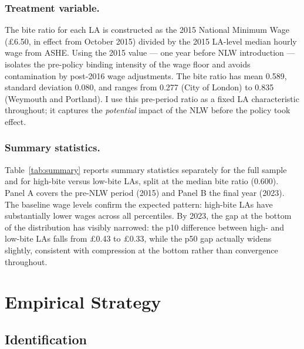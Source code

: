 \documentclass[12pt]{article}
\begin{document}
\subsubsection*{Treatment variable.}
The bite ratio for each LA is constructed as the 2015 National Minimum Wage (\pounds6.50, in effect from October 2015) divided by the 2015 LA-level median hourly wage from ASHE. Using the 2015 value --- one year before NLW introduction --- isolates the pre-policy binding intensity of the wage floor and avoids contamination by post-2016 wage adjustments. The bite ratio has mean 0.589, standard deviation 0.080, and ranges from 0.277 (City of London) to 0.835 (Weymouth and Portland). I use this pre-period ratio as a fixed LA characteristic throughout; it captures the \textit{potential} impact of the NLW before the policy took effect.

\subsubsection*{Summary statistics.}
Table~\ref{tab:summary} reports summary statistics separately for the full sample and for high-bite versus low-bite LAs, split at the median bite ratio (0.600). Panel A covers the pre-NLW period (2015) and Panel B the final year (2023). The baseline wage levels confirm the expected pattern: high-bite LAs have substantially lower wages across all percentiles. By 2023, the gap at the bottom of the distribution has visibly narrowed: the p10 difference between high- and low-bite LAs falls from \pounds0.43 to \pounds0.33, while the p50 gap actually widens slightly, consistent with compression at the bottom rather than convergence throughout.



\section{Empirical Strategy}
\label{sec:strategy}

\subsection{Identification}
\end{document}
